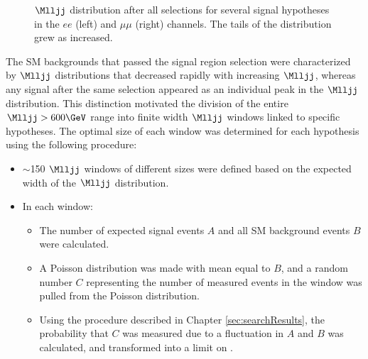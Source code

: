 \begin{figure}[btp]
	\centering
	\label{fig:signalShapesAfterSelection}
	\caption{$\Mlljj$ distribution after all selections for several \WR signal hypotheses in the $ee$ (left) and $\mu\mu$ (right) 
		channels.  The tails of the distribution grew as \mWR increased.}
\end{figure}

The SM backgrounds that passed the signal region selection were characterized by $\Mlljj$ 
distributions that decreased rapidly with increasing $\Mlljj$, whereas any \WR signal 
after the same selection appeared as an individual peak in the $\Mlljj$ distribution.  
This distinction motivated the division of the entire $\Mlljj > 600\GeV$ range into finite 
width $\Mlljj$ windows linked to specific \mWR hypotheses.  The optimal size of each window was 
determined for each \mWR hypothesis using the following procedure:

\begin{itemize}
	\item $\sim$150 $\Mlljj$ windows of different sizes were defined based on the expected width of the $\Mlljj$ distribution.
	\item In each window:
	\begin{itemize}
		\item The number of expected signal events $A$ and all SM background events $B$ were calculated.
		\item A Poisson distribution was made with mean equal to $B$, and a random number $C$ representing 
			the number of measured events in the window was pulled from the Poisson distribution.
		\item Using the procedure described in Chapter \ref{sec:searchResults}, the probability that $C$ 
			was measured due to a fluctuation in $A$ and $B$ was calculated, and transformed into a limit 
			on .
	\end{itemize}
\end{itemize}


